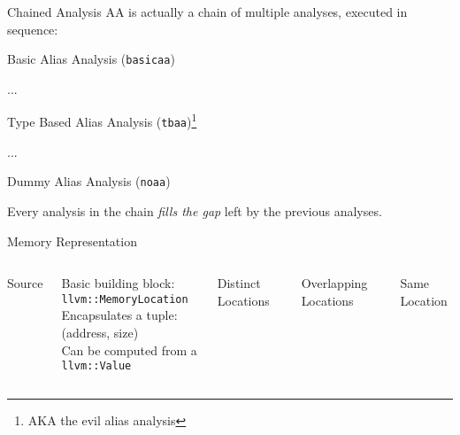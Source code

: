 \begin{frame}{Chained Analysis}
AA is actually a chain of multiple analyses, executed in sequence:
\medskip
\begin{description}[XXXXlast.]
\item[1.] Basic Alias Analysis (\texttt{basicaa})
\item[] ...
\item[n$^{\textsf{th}}$.] Type Based Alias Analysis (\texttt{tbaa})\footnote{AKA the evil alias analysis}
\item[] ...
\item[last.] Dummy Alias Analysis (\texttt{noaa})
\end{description}
\medskip
Every analysis in the chain \emph{fills the gap} left by the previous analyses.
\end{frame}


\begin{frame}{Memory Representation}
\begin{columns}
\begin{block}{Source}
\centering
{}
\end{block}

\centering
Basic building block:\\\texttt{llvm::MemoryLocation}\\
\medskip
Encapsulates a tuple:\\(\alert{address}, \alert{size})\\
\medskip
Can be computed from a \texttt{llvm::Value}

\begin{block}{Distinct Locations}
\centering

\end{block}

\begin{block}{Overlapping Locations}
\centering

\end{block}

\begin{block}{Same Location}
\centering

\end{block}

\end{columns}
\end{frame}


